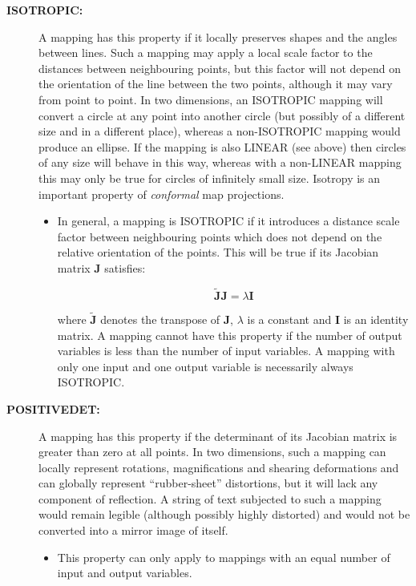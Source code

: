 \documentclass[twoside,11pt]{article}
\renewcommand{\_}{\texttt{\symbol{95}}}
\newcommand{\name}[1]{\mbox{\small{#1}}}
\begin{document}
\begin{description}
\item[\textbf{ISOTROPIC:}] A mapping has this property if it locally preserves
shapes and the angles between lines.
Such a mapping may apply a local scale factor to the distances between
neighbouring points, but this factor will not depend on the orientation
of the line between the two points, although it may vary from point to
point.
In two dimensions, an \name{ISOTROPIC} mapping will convert a circle at any
point into another circle (but possibly of a different size and in a
different place), whereas a non-\name{ISOTROPIC} mapping would produce an
ellipse.
If the mapping is also \name{LINEAR} (see above) then circles of
any size will behave in this way, whereas with a non-\name{LINEAR}
mapping this may only be true for circles of infinitely small size.
Isotropy is an important property of \emph{conformal} map projections.

\begin{itemize}
\item In general, a mapping is \name{ISOTROPIC} if it introduces a distance
scale factor between neighbouring points which does not depend on the
relative orientation of the points.
This will be true if its Jacobian matrix $\textbf{J}$ satisfies:

\begin{equation}
\mathbf{\tilde{J}} \mathbf{J} = \lambda \mathbf{I}
\end{equation}

where $\mathbf{\tilde{J}}$ denotes the transpose of $\mathbf{J}$, $\lambda$ is a
constant and $\mathbf{I}$ is an identity matrix.
A mapping cannot have this property if the number of output variables is
less than the number of input variables.
A mapping with only one input and one output variable is necessarily always
\name{ISOTROPIC}.

\end{itemize}

\item[\textbf{POSITIVE\_DET:}] A mapping has this property if the determinant
of its Jacobian matrix is greater than zero at all points.
In two dimensions, such a mapping can locally represent rotations,
magnifications and shearing deformations and can globally represent
``rubber-sheet'' distortions, but it will lack any component of reflection.
A string of text subjected to such a mapping would remain legible (although
possibly highly distorted) and would not be converted into a mirror image of
itself.

\begin{itemize}
\item This property can only apply to mappings with an equal number of input
and output variables.
\end{itemize}


\end{description}
\end{document}
